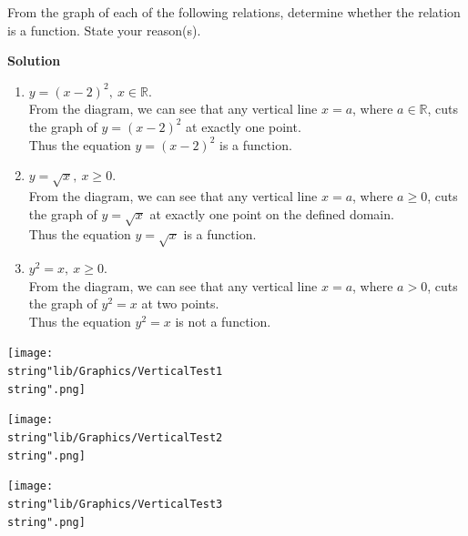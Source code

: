 \documentclass[11pt,a4paper]{book}
\newcommand{\R}{\mathbb{R}}
\begin{document}
\begin{example}{}
From the graph of each of the following relations, determine whether
the relation is a function. State your reason(s).

\textbf{Solution}

\begin{minipage}[t]{0.6\textwidth}

\begin{enumerate}[label=(\alph*)]

\item  $y=\left(x-2\right)^{2},\:x\in\R$. \\
From the diagram, we can see that any vertical line $x=a$, where
$a\in\R$, cuts the graph of $y=\left(x-2\right)^{2}$ at exactly
one point.\\
Thus the equation $y=\left(x-2\right)^{2}$ is a function.

\vspace{3.5cm}

\item$y=\sqrt{x},\:x\geq0$.\\
From the diagram, we can see that any vertical line $x=a$, where
$a\geq0$, cuts the graph of $y=\sqrt{x}$ at exactly one point on
the defined domain.\\
Thus the equation $y=\sqrt{x}$ is a function.

\vspace{3.5cm}

\item$y^{2}=x,\:x\geq0$.\\
From the diagram, we can see that any vertical line $x=a$, where
$a>0$, cuts the graph of $y^{2}=x$ at two points.\\
Thus the equation $y^{2}=x$ is not a function.

\end{enumerate}

\end{minipage}
\begin{minipage}[t]{0.1\textwidth}
\begin{center}
\texttt{[image: \\string"lib/Graphics/VerticalTest1\\string".png]}
\par\end{center}

\begin{center}
\texttt{[image: \\string"lib/Graphics/VerticalTest2\\string".png]}
\par\end{center}

\begin{center}
\texttt{[image: \\string"lib/Graphics/VerticalTest3\\string".png]}
\par\end{center}
\end{minipage}
\end{example}
\end{document}
